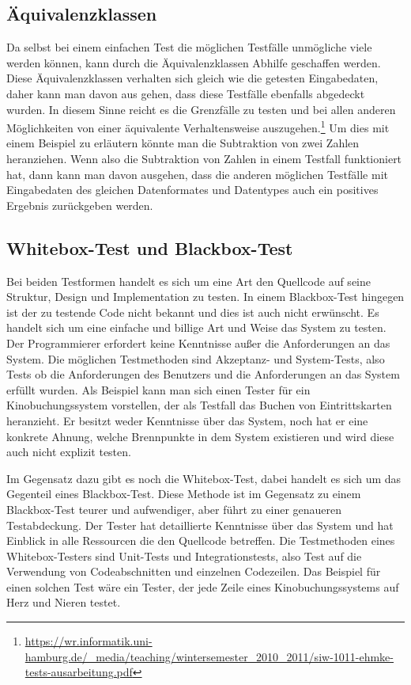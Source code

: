 \subsection{Äquivalenzklassen}
Da selbst bei einem einfachen Test die möglichen Testfälle unmögliche viele werden können, kann durch die Äquivalenzklassen Abhilfe geschaffen werden. 
Diese Äquivalenzklassen verhalten sich gleich wie die getesten Eingabedaten, daher kann man davon aus gehen, dass diese Testfälle ebenfalls abgedeckt wurden. 
In diesem Sinne reicht es die Grenzfälle zu testen und bei allen anderen Möglichkeiten von einer äquivalente Verhaltensweise auszugehen.\footnote{\url{https://wr.informatik.uni-hamburg.de/_media/teaching/wintersemester_2010_2011/siw-1011-ehmke-tests-ausarbeitung.pdf}}  
Um dies mit einem Beispiel zu erläutern könnte man die Subtraktion von zwei Zahlen heranziehen. 
Wenn also die Subtraktion von Zahlen in einem Testfall funktioniert hat, dann kann man davon ausgehen, dass die anderen möglichen Testfälle mit Eingabedaten des gleichen Datenformates und Datentypes auch ein positives Ergebnis zurückgeben werden.

\subsection{Whitebox-Test und Blackbox-Test}
Bei beiden Testformen handelt es sich um eine Art den Quellcode auf seine Struktur, Design und Implementation zu testen. 
In einem Blackbox-Test hingegen ist der zu testende Code nicht bekannt und dies ist auch nicht erwünscht. 
Es handelt sich um eine einfache und billige Art und Weise das System zu testen. 
Der Programmierer erfordert keine Kenntnisse außer die Anforderungen an das System. Die möglichen Testmethoden sind Akzeptanz- und System-Tests, also Tests ob die Anforderungen des Benutzers und die Anforderungen an das System erfüllt wurden.  
Als Beispiel kann man sich einen Tester für ein Kinobuchungssystem vorstellen, der als Testfall das Buchen von Eintrittskarten heranzieht. 
Er besitzt weder Kenntnisse über das System, noch hat er eine konkrete Ahnung, welche Brennpunkte in dem System existieren und wird diese auch nicht explizit testen. 

Im Gegensatz dazu gibt es noch die Whitebox-Test, dabei handelt es sich um das Gegenteil eines Blackbox-Test.
Diese Methode ist im Gegensatz zu einem Blackbox-Test teurer und aufwendiger, aber führt zu einer genaueren Testabdeckung.
Der Tester hat detaillierte Kenntnisse über das System und hat Einblick in alle Ressourcen die den Quellcode betreffen.  
Die Testmethoden eines Whitebox-Testers sind Unit-Tests und Integrationstests, also Test auf die Verwendung von Codeabschnitten und einzelnen Codezeilen.
Das Beispiel für einen solchen Test wäre ein Tester, der jede Zeile eines Kinobuchungssystems auf Herz und Nieren testet. 